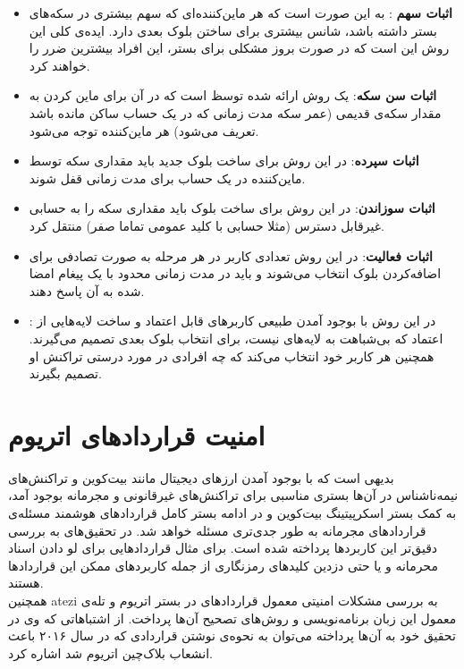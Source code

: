 \begin{itemize}
	\item \textbf{اثبات سهم}
	:
	به این صورت است که هر ماین‌کننده‌ای که سهم بیشتری در سکه‌های بستر داشته باشد، شانس بیشتری برای ساختن بلوک بعدی دارد. ایده‌ی کلی این روش این است که در صورت بروز مشکلی برای بستر، این افراد بیشترین ضرر را خواهند کرد. 
	\item \textbf{اثبات سن سکه}:
	یک روش ارائه شده توسظ 
	است که در آن برای ماین کردن به مقدار سکه‌ی قدیمی (عمر سکه مدت زمانی که در یک حساب ساکن مانده باشد تعریف می‌شود) هر ماین‌کننده توجه می‌شود.
	\item \textbf{اثبات سپرده}:
	در این روش برای ساخت بلوک‌ جدید باید مقداری سکه توسط ماین‌کننده در یک حساب برای مدت زمانی قفل شوند.
	\item \textbf{اثبات سوزاندن}:
	در این روش برای ساخت بلوک‌ باید مقداری سکه را به حسابی غیرقابل دسترس (مثلا حسابی با کلید عمومی تماما صفر) منتقل کرد.
	\item \textbf{اثبات فعالیت}:
	در این روش تعدادی کاربر در هر مرحله به صورت تصادفی  برای اضافه‌کردن بلوک انتخاب می‌شوند و باید در مدت زمانی محدود با یک پیغام امضا شده به آن پاسخ دهند. 
	\item \textbf{}\cite{scp}:
	در این روش با بوجود آمدن طبیعی کاربرهای قابل اعتماد و ساخت لایه‌هایی از اعتماد که بی‌شباهت به لایه‌های 
	نیست، برای انتخاب بلوک بعدی تصمیم می‌گیرند. همچنین هر کاربر خود انتخاب می‌کند که چه افرادی در مورد درستی تراکنش او تصمیم بگیرند.
\end{itemize}

\section{امنیت قرارداد‌های اتریوم}

بدیهی است که با بوجود آمدن ارزهای دیجیتال مانند بیت‌کوین و تراکنش‌های نیمه‌ناشناس در آن‌ها بستری مناسبی برای تراکنش‌های غیرقانونی و مجرمانه بوجود آمد، به کمک بستر اسکرپیتینگ بیت‌کوین و در ادامه بستر کامل قرارداد‌های هوشمند مسئله‌ی قرارداد‌های مجرمانه به طور جدی‌تری مسئله خواهد شد. در تحقیق‌های 
\cite{gyges} \cite{smart}
به بررسی دقیق‌تر این کاربردها پرداخته شده است. برای مثال قراردادهایی برای لو دادن اسناد محرمانه و یا حتی دزدین کلید‌های رمزنگاری از جمله کاربرد‌های ممکن این قراردادها هستند. 
\\
همچنین atezi
\cite{surveyAtt}
 به بررسی مشکلات امنیتی معمول قراردادهای در بستر اتریوم و تله‌ی معمول این زبان برنامه‌نویسی و روش‌های تصحیح آن‌ها پرداخت. از اشتباهاتی که وی در تحقیق خود به آن‌ها پرداخته می‌توان به نحوه‌ی نوشتن قراردادی که در سال ۲۰۱۶ باعث انشعاب بلاک‌چین اتریوم شد اشاره کرد. 
 
